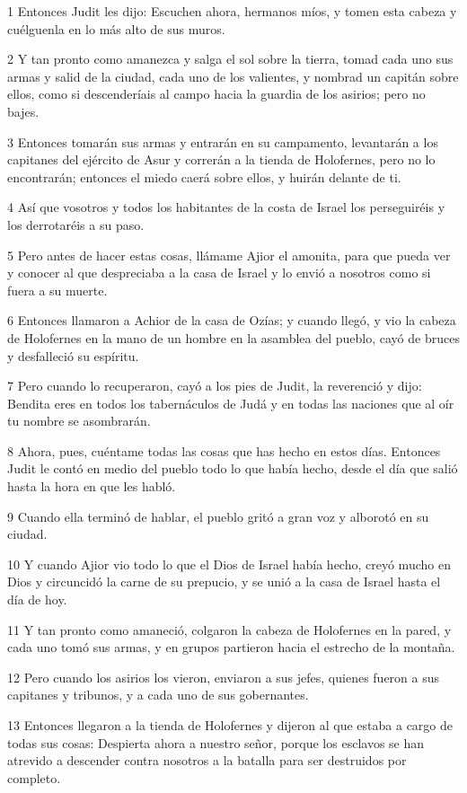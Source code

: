 \par 1 Entonces Judit les dijo: Escuchen ahora, hermanos míos, y tomen esta cabeza y cuélguenla en lo más alto de sus muros.
\par 2 Y tan pronto como amanezca y salga el sol sobre la tierra, tomad cada uno sus armas y salid de la ciudad, cada uno de los valientes, y nombrad un capitán sobre ellos, como si descenderíais al campo hacia la guardia de los asirios; pero no bajes.
\par 3 Entonces tomarán sus armas y entrarán en su campamento, levantarán a los capitanes del ejército de Asur y correrán a la tienda de Holofernes, pero no lo encontrarán; entonces el miedo caerá sobre ellos, y huirán delante de ti.
\par 4 Así que vosotros y todos los habitantes de la costa de Israel los perseguiréis y los derrotaréis a su paso.
\par 5 Pero antes de hacer estas cosas, llámame Ajior el amonita, para que pueda ver y conocer al que despreciaba a la casa de Israel y lo envió a nosotros como si fuera a su muerte.
\par 6 Entonces llamaron a Achior de la casa de Ozías; y cuando llegó, y vio la cabeza de Holofernes en la mano de un hombre en la asamblea del pueblo, cayó de bruces y desfalleció su espíritu.
\par 7 Pero cuando lo recuperaron, cayó a los pies de Judit, la reverenció y dijo: Bendita eres en todos los tabernáculos de Judá y en todas las naciones que al oír tu nombre se asombrarán.
\par 8 Ahora, pues, cuéntame todas las cosas que has hecho en estos días. Entonces Judit le contó en medio del pueblo todo lo que había hecho, desde el día que salió hasta la hora en que les habló.
\par 9 Cuando ella terminó de hablar, el pueblo gritó a gran voz y alborotó en su ciudad.
\par 10 Y cuando Ajior vio todo lo que el Dios de Israel había hecho, creyó mucho en Dios y circuncidó la carne de su prepucio, y se unió a la casa de Israel hasta el día de hoy.
\par 11 Y tan pronto como amaneció, colgaron la cabeza de Holofernes en la pared, y cada uno tomó sus armas, y en grupos partieron hacia el estrecho de la montaña.
\par 12 Pero cuando los asirios los vieron, enviaron a sus jefes, quienes fueron a sus capitanes y tribunos, y a cada uno de sus gobernantes.
\par 13 Entonces llegaron a la tienda de Holofernes y dijeron al que estaba a cargo de todas sus cosas: Despierta ahora a nuestro señor, porque los esclavos se han atrevido a descender contra nosotros a la batalla para ser destruidos por completo.
